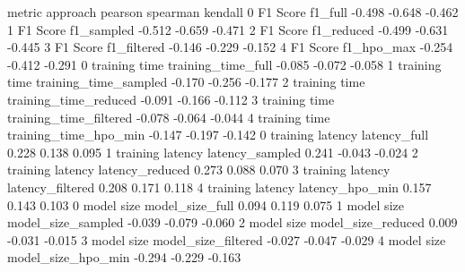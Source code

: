              metric                approach pearson spearman kendall
0          F1 Score                 f1_full  -0.498   -0.648  -0.462
1          F1 Score              f1_sampled  -0.512   -0.659  -0.471
2          F1 Score              f1_reduced  -0.499   -0.631  -0.445
3          F1 Score             f1_filtered  -0.146   -0.229  -0.152
4          F1 Score              f1_hpo_max  -0.254   -0.412  -0.291
0     training time      training_time_full  -0.085   -0.072  -0.058
1     training time   training_time_sampled  -0.170   -0.256  -0.177
2     training time   training_time_reduced  -0.091   -0.166  -0.112
3     training time  training_time_filtered  -0.078   -0.064  -0.044
4     training time   training_time_hpo_min  -0.147   -0.197  -0.142
0  training latency            latency_full   0.228    0.138   0.095
1  training latency         latency_sampled   0.241   -0.043  -0.024
2  training latency         latency_reduced   0.273    0.088   0.070
3  training latency        latency_filtered   0.208    0.171   0.118
4  training latency         latency_hpo_min   0.157    0.143   0.103
0        model size         model_size_full   0.094    0.119   0.075
1        model size      model_size_sampled  -0.039   -0.079  -0.060
2        model size      model_size_reduced   0.009   -0.031  -0.015
3        model size     model_size_filtered  -0.027   -0.047  -0.029
4        model size      model_size_hpo_min  -0.294   -0.229  -0.163